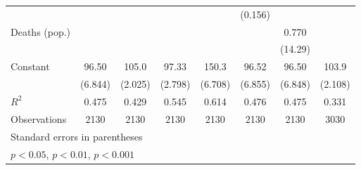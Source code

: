 \documentclass{article}
\begin{document}
{\begin{longtable}{l*{7}{c}}
                &                  &                  &                  &                  &  (0.156)         &                  &                  \\
Deaths (pop.)   &                  &                  &                  &                  &                  &    0.770         &                  \\
                &                  &                  &                  &                  &                  &  (14.29)         &                  \\
Constant        &    96.50\sym{***}&    105.0\sym{***}&    97.33\sym{***}&    150.3\sym{***}&    96.52\sym{***}&    96.50\sym{***}&    103.9\sym{***}\\
                &  (6.844)         &  (2.025)         &  (2.798)         &  (6.708)         &  (6.855)         &  (6.848)         &  (2.108)         \\
\hline
\(R^{2}\)       &    0.475         &    0.429         &    0.545         &    0.614         &    0.476         &    0.475         &    0.331         \\
Observations    &     2130         &     2130         &     2130         &     2130         &     2130         &     2130         &     3030         \\
\hline\hline
\multicolumn{8}{l}{\footnotesize Standard errors in parentheses}\\
\multicolumn{8}{l}{\footnotesize \sym{*} \(p<0.05\), \sym{**} \(p<0.01\), \sym{***} \(p<0.001\)}\\
\end{longtable}
}
\end{document}
